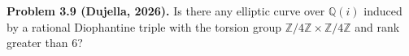 \textbf{Problem 3.9 (Dujella, 2026).} Is there any elliptic curve over $\mathbb{Q}(i)$ induced by a rational Diophantine triple with the torsion group $\mathbb{Z}/4\mathbb{Z}\times\mathbb{Z}/4\mathbb{Z}$ and rank greater than 6?
